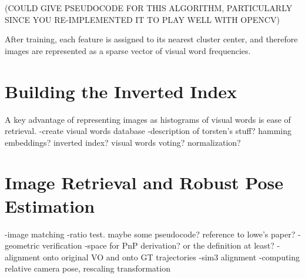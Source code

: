 (COULD GIVE PSEUDOCODE FOR THIS ALGORITHM, PARTICULARLY SINCE YOU RE-IMPLEMENTED IT TO PLAY WELL WITH OPENCV)

After training, each feature is assigned to its nearest cluster center, and therefore images are represented as a sparse vector of visual word frequencies.

\section{Building the Inverted Index}

A key advantage of representing images as histograms of visual words is ease of retrieval.
-create visual words database
	-description of torsten's stuff? hamming embeddings? inverted index? visual words voting? normalization?


\section{Image Retrieval and Robust Pose Estimation}

-image matching
	-ratio test. maybe some pseudocode? reference to lowe's paper?
-geometric verification
	-space for PnP derivation? or the definition at least?
-alignment onto original VO and onto GT trajectories
	-sim3 alignment
	-computing relative camera pose, rescaling transformation
